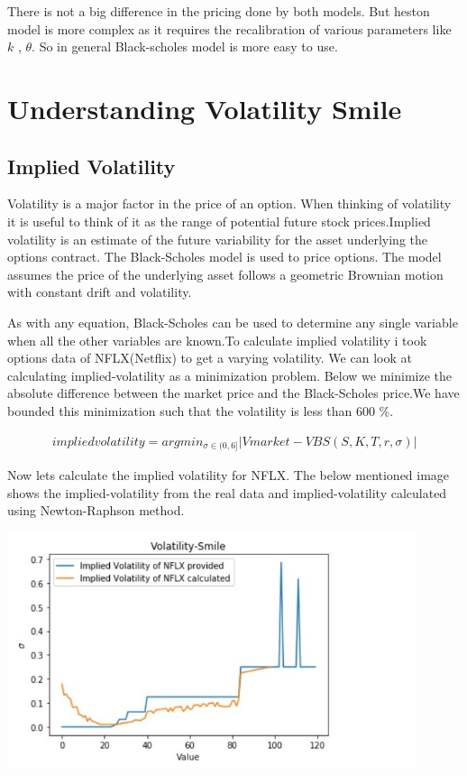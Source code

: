 \documentclass[12pt]{article}
\begin{document}
There is not a big difference in the pricing done by both models. But heston model is more complex as it requires the recalibration of various parameters like $k$ , $\theta$. So in general Black-scholes model is more easy to use.


  
\section{Understanding Volatility Smile}

 \subsection{Implied Volatility}
 Volatility is a major factor in the price of an option. When thinking of volatility it is useful to think of it as the range of potential future stock prices.Implied volatility is an estimate of the future variability for the asset underlying the options contract. The Black-Scholes model is used to price options. The model assumes the price of the underlying asset follows a geometric Brownian motion with constant drift and volatility.
 
 As with any equation, Black-Scholes can be used to determine any single variable when all the other variables are known.To calculate implied volatility i took options data of NFLX(Netflix) to get a varying volatility. We can look at calculating implied-volatility as a minimization problem. Below we minimize the absolute difference between the market price and the Black-Scholes price.We have bounded this minimization such that the volatility is less than 600 \%.
 
 
\begin{align}
	implied volatility=argmin_{\sigma \in(0,6]} |Vmarket  - VBS(S,K,T,r,\sigma)|
\end{align}

Now lets calculate the implied volatility for NFLX. The below mentioned image shows the implied-volatility from the real data and implied-volatility calculated using Newton-Raphson method. \cite{bworld}

\includegraphics[width=12cm]{p6}
\end{document}
